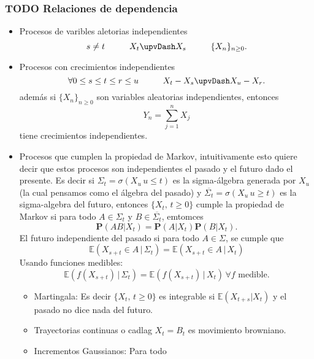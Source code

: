 \documentclass[letterpaper]{article}
\begin{document}
\subsubsection{{\bfseries\sffamily TODO} Relaciones de dependencia}
\label{sec:org54ce3e6}
\begin{itemize}
\item Procesos de varibles aletorias independientes
\[
   s\neq t\hspace{1cm} X_t\upvDash X_s\hspace{1cm}\{X_n\}_{n\geq 0} .
  \]
\item Procesos con crecimientos independientes
\[
   \forall 0\leq s\leq t\leq r\leq u\hspace{1cm} X_t-X_s\upvDash X_u-X_r.
  \]
además si \(\{X_n\}_{n\geq 0}\) son variables aleatorias independientes, entonces
\[
    Y_n=\sum_{j=1}^n X_j
  \]
tiene crecimientos independientes.
\item Procesos que cumplen la propiedad de Markov, intuitivamente esto quiere decir que estos procesos son independientes el pasado y el futuro dado el presente. Es decir si \(\Sigma_t=\sigma(X_u\,u\leq t)\) es la sigma-álgebra generada por \(X_u\) (la cual pensamos como el álgebra del pasado) y \(\overline{\Sigma_t}=\sigma(X_u\,u\geq t)\) es la sigma-algebra del futuro, entonces \(\{ X_t,\,t\geq 0\}\) cumple la propiedad de Markov si para todo \(A\in\Sigma_t\) y \(B\in\overline{\Sigma_t}\), emtomces
\[
       \textbf{P}(AB|X_t)=\textbf{P}(A|X_t)\textbf{P}(B|X_t).
  \]
El futuro independiente del pasado si para todo \(A\in\Sigma\), se cumple que
\[
        \mathbb{E}(X_{s+t}\in A\,|\,\Sigma_t)=\mathbb{E}(X_{s+t}\in A\,|\,X_t)
  \]
Usando funciones medibles:
\[
        \mathbb{E}(f(X_{s+t})\,|\,\Sigma_t)=\mathbb{E}(f(X_{s+t})\,|\,X_t)\,\forall f \text{ medible}.
  \]
\begin{itemize}
\item Martingala: Es decir \(\{X_t,\,t\geq0\}\) es integrable si \(\mathbb{E}(X_{t+s}|X_t)\) y el pasado no dice nada del futuro.
\item Trayectorias continuas o cadlag \(X_t=B_t\) es movimiento browniano.
\item Incrementos Gaussianos: Para todo
\end{itemize}
\end{itemize}
\end{document}
